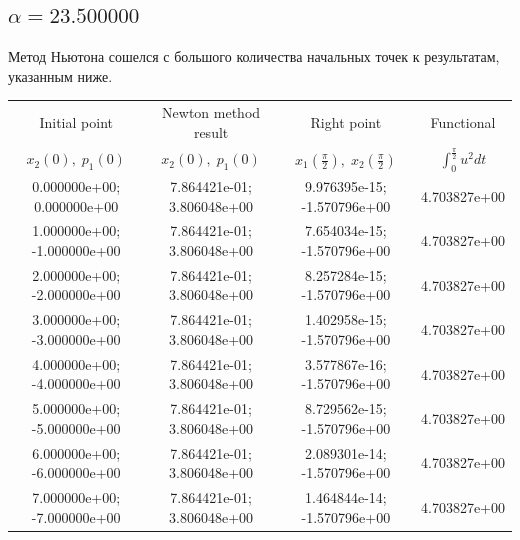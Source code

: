 \documentclass[titlepage]{article}
\def\l{\left}
\def\r{\right}
\begin{document}
\subsection{$\alpha = 23.500000$} 
Метод Ньютона сошелся с большого количества начальных точек к результатам, указанным ниже. \\ 
\begin{tabular}{ | c | c | c | c |} 
\hline 
Initial point  & Newton method result & Right point & Functional 
 \\ $x_2(0), \; p_1(0)$ & $x_2(0), \; p_1(0)$ & $x_1\l(\frac{\pi}{2}\r), \; x_2\l(\frac{\pi}{2}\r)$ & $\int_{0}^{\frac{\pi}{2}}u^2dt$  \\ \hline 
0.000000e+00; 0.000000e+00 & 7.864421e-01; 3.806048e+00 & 9.976395e-15; -1.570796e+00 & 4.703827e+00 \\ \hline 
1.000000e+00; -1.000000e+00 & 7.864421e-01; 3.806048e+00 & 7.654034e-15; -1.570796e+00 & 4.703827e+00 \\ \hline 
2.000000e+00; -2.000000e+00 & 7.864421e-01; 3.806048e+00 & 8.257284e-15; -1.570796e+00 & 4.703827e+00 \\ \hline 
3.000000e+00; -3.000000e+00 & 7.864421e-01; 3.806048e+00 & 1.402958e-15; -1.570796e+00 & 4.703827e+00 \\ \hline 
4.000000e+00; -4.000000e+00 & 7.864421e-01; 3.806048e+00 & 3.577867e-16; -1.570796e+00 & 4.703827e+00 \\ \hline 
5.000000e+00; -5.000000e+00 & 7.864421e-01; 3.806048e+00 & 8.729562e-15; -1.570796e+00 & 4.703827e+00 \\ \hline 
6.000000e+00; -6.000000e+00 & 7.864421e-01; 3.806048e+00 & 2.089301e-14; -1.570796e+00 & 4.703827e+00 \\ \hline 
7.000000e+00; -7.000000e+00 & 7.864421e-01; 3.806048e+00 & 1.464844e-14; -1.570796e+00 & 4.703827e+00 \\ \hline 
\end{tabular} 
\end{document}
